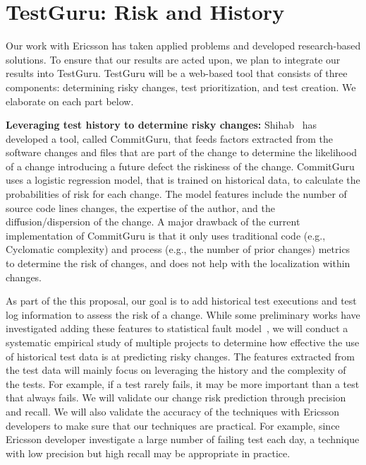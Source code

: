 \section{TestGuru: Risk and History}
\label{secTestGuru}

Our work with Ericsson has taken applied problems and developed research-based solutions. To ensure that our results are acted upon, we plan to integrate our results into TestGuru. TestGuru will be a web-based tool that consists of three components: determining risky changes, test prioritization, and test creation. We elaborate on each part below.

\textbf{Leveraging test history to determine risky changes:} Shihab~\cite{Rosen2015FSE} has developed a tool, called CommitGuru, that feeds factors extracted from the software changes and files that are part of the change to determine the likelihood of a change introducing a future defect \ie the riskiness of the change. CommitGuru uses a logistic regression model, that is trained on historical data, to calculate the probabilities of risk for each change. The model features include the number of source code lines changes, the expertise of the author, and the diffusion/dispersion of the change. A major drawback of the current implementation of CommitGuru is that it only uses traditional code (e.g., Cyclomatic complexity) and process (e.g., the number of prior changes) metrics to determine the risk of changes, and does not help with the localization within changes. 

As part of the this proposal, our goal is to add historical test executions and test log information to assess the risk of a change. While some preliminary works have investigated adding these features to statistical fault model~\cite{Herzig2014ISSRE}, we will conduct a systematic empirical study of multiple projects to determine how effective the use of historical test data is at predicting risky changes. The features extracted from the test data will mainly focus on leveraging the history and the complexity of the tests. For example, if a test rarely fails, it may be more important than a test that always fails. We will validate our change risk prediction through precision and recall. We will also validate the accuracy of the techniques with Ericsson developers to make sure that our techniques are practical. For example, since Ericsson developer investigate a large number of failing test each day, a technique with low precision but high recall may be appropriate in practice.

